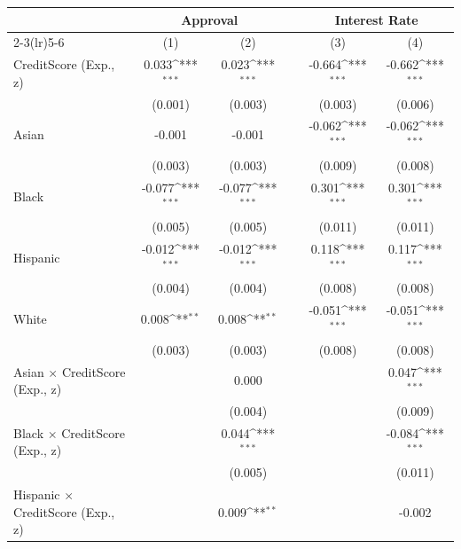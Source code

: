 {\def\sym#1{\ifmmode^{#1}\else\(^{#1}\)\fi}
\begin{tabular}{l*{5}{c}} \toprule
                &\multicolumn{2}{c}{Approval}         &         &\multicolumn{2}{c}{Interest Rate}    \\\cmidrule(lr){2-3}\cmidrule(lr){5-6}
                &\multicolumn{1}{c}{(1)}         &\multicolumn{1}{c}{(2)}         &         &\multicolumn{1}{c}{(3)}         &\multicolumn{1}{c}{(4)}         \\
\midrule
CreditScore (Exp., z)&    0.033\sym{***}&    0.023\sym{***}&         &   -0.664\sym{***}&   -0.662\sym{***}\\
                &  (0.001)         &  (0.003)         &         &  (0.003)         &  (0.006)         \\
Asian           &   -0.001         &   -0.001         &         &   -0.062\sym{***}&   -0.062\sym{***}\\
                &  (0.003)         &  (0.003)         &         &  (0.009)         &  (0.008)         \\
Black           &   -0.077\sym{***}&   -0.077\sym{***}&         &    0.301\sym{***}&    0.301\sym{***}\\
                &  (0.005)         &  (0.005)         &         &  (0.011)         &  (0.011)         \\
Hispanic        &   -0.012\sym{***}&   -0.012\sym{***}&         &    0.118\sym{***}&    0.117\sym{***}\\
                &  (0.004)         &  (0.004)         &         &  (0.008)         &  (0.008)         \\
White           &    0.008\sym{**} &    0.008\sym{**} &         &   -0.051\sym{***}&   -0.051\sym{***}\\
                &  (0.003)         &  (0.003)         &         &  (0.008)         &  (0.008)         \\
Asian $\times$ CreditScore (Exp., z)&                  &    0.000         &         &                  &    0.047\sym{***}\\
                &                  &  (0.004)         &         &                  &  (0.009)         \\
Black $\times$ CreditScore (Exp., z)&                  &    0.044\sym{***}&         &                  &   -0.084\sym{***}\\
                &                  &  (0.005)         &         &                  &  (0.011)         \\
Hispanic $\times$ CreditScore (Exp., z)&                  &    0.009\sym{**} &         &                  &   -0.002         \\

\end{tabular}}
